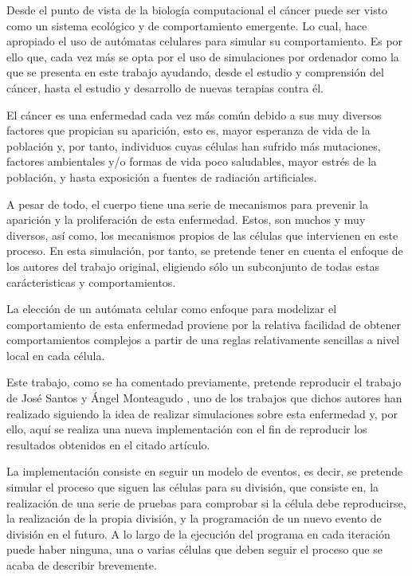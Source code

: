 Desde el punto de vista de la biología computacional el cáncer puede ser visto como un sistema ecológico y de comportamiento emergente.
Lo cual, hace apropiado el uso de autómatas celulares para simular su comportamiento. Es por ello que, cada vez más se opta por el uso
de simulaciones por ordenador como la que se presenta en este trabajo ayudando, desde el estudio y comprensión del cáncer, hasta
el estudio y desarrollo de nuevas terapias contra él.

El cáncer es una enfermedad cada vez más común debido a sus muy diversos factores que propician su aparición, esto es,
mayor esperanza de vida de la población y, por tanto, individuos cuyas células han sufrido más mutaciones, factores ambientales y/o
formas de vida poco saludables, mayor estrés de la población, y hasta exposición a fuentes de radiación artificiales.

A pesar de todo, el cuerpo tiene una serie de mecanismos para prevenir la aparición y la proliferación de esta enfermedad. Estos,
son muchos y muy diversos, así como, los mecanismos propios de las células que intervienen en este proceso. En esta simulación, por tanto,
se pretende tener en cuenta el enfoque de los autores del trabajo original, eligiendo sólo un subconjunto de todas estas
carácteristicas y comportamientos.

La elección de un autómata celular como enfoque para modelizar el comportamiento de esta enfermedad proviene por la relativa
facilidad de obtener comportamientos complejos a partir de una reglas relativamente sencillas a nivel local en cada célula.

Este trabajo, como se ha comentado previamente, pretende reproducir el trabajo de José Santos y Ángel Monteagudo \cite{jsantos-amonteagudo-1-2014},
uno de los trabajos \cite{jsantos-amonteagudo-2012} \cite{jsantos-amonteagudo-2013} \cite{jsantos-amonteagudo-2015} que dichos autores han realizado siguiendo la idea de realizar simulaciones sobre esta enfermedad y, por ello, aquí
se realiza una nueva implementación con el fin de reproducir los resultados obtenidos en el citado artículo.

\newpage

La implementación consiste en seguir un modelo de eventos, es decir, se pretende simular el proceso que siguen las células para su división, que
consiste en, la realización de una serie de pruebas para comprobar si la célula debe reproducirse, la realización de la propia división, y
la programación de un nuevo evento de división en el futuro. A lo largo de la ejecución del programa en cada iteración puede haber ninguna, una o
varias células que deben seguir el proceso que se acaba de describir brevemente.

